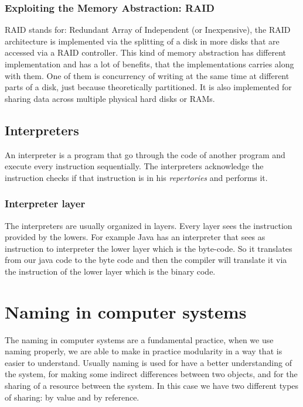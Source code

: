 \documentclass{article}
\begin{document}
      \subsubsection{Exploiting the Memory Abstraction: RAID}
        RAID stands for: Redundant Array of Independent (or Inexpensive), the RAID
        architecture is implemented via the splitting of a disk in more disks that 
        are accessed via a RAID controller. This kind of memory abstraction has 
        different implementation and has a lot of benefits, that the implementations
        carries along with them. One of them is concurrency of writing at the same
        time at different parts of a disk, just because theoretically partitioned.
        It is also implemented for sharing data across multiple physical hard disks or 
        RAMs.
    \subsection{Interpreters}
      An interpreter is a program that go through the code of another program and execute
      every instruction sequentially. The interpreters acknowledge the instruction checks if that
      instruction is in his \textit{repertories} and performs it.
      \subsubsection{Interpreter layer}
        The interpreters are usually organized in layers. Every layer sees the 
        instruction provided by the lowers. For example Java has an interpreter
        that sees as instruction to interpreter the lower layer which is the byte-code.
        So it translates from our java code to the byte code and then the compiler will
        translate it via the instruction of the lower layer which is the binary code.
  \section{Naming in computer systems}
    The naming in computer systems are a fundamental practice, 
    when we use naming properly, we are able to make in practice 
    modularity in a way that is easier to understand. Usually naming 
    is used for have a better understanding of the system, for making
    some indirect differences between two objects, and for the sharing
    of a resource between the system. In this case we have two different 
    types of sharing: by value and by reference.
\end{document}

